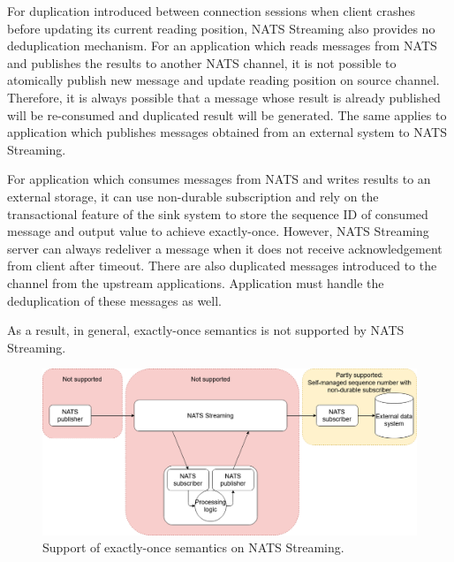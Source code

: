For duplication introduced between connection sessions when client crashes before updating its current reading position, NATS Streaming also provides no deduplication mechanism. For an application which reads messages from NATS and publishes the results to another NATS channel, it is not possible to atomically publish new message and update reading position on source channel. Therefore, it is always possible that a message whose result is already published will be re-consumed and duplicated result will be generated. The same applies to application which publishes messages obtained from an external system to NATS Streaming.

For application which consumes messages from NATS and writes results to an external storage, it can use non-durable subscription and rely on the transactional feature of the sink system to store the sequence ID of consumed message and output value to achieve exactly-once. However, NATS Streaming server can always redeliver a message when it does not receive acknowledgement from client after timeout. There are also duplicated messages introduced to the channel from the upstream applications. Application must handle the deduplication of these messages as well.

As a result, in general, exactly-once semantics is not supported by NATS Streaming.


\begin{figure}[h]
	\centering
	\includegraphics[width=\linewidth]{images/exactly-once-nats.png}
	\caption{Support of exactly-once semantics on NATS Streaming.}
	\label{fig:exactlyoncenats}
\end{figure}






